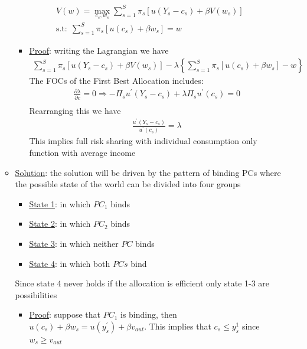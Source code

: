 \documentclass{article}
\begin{document}
\begin{itemize}
\begin{itemize}
        \begin{gather*}
            V(w) = \max_{c_{s}, w_{s}} \sum_{s=1}^{S} \pi_{s} [u(Y_{s} - c_{s}) + \beta V(w_{s})] \\
            \text{s.t:} \ \ \sum_{s=1}^{S} \pi_{s} [u(c_{s}) + \beta w_{s}] = w
        \end{gather*}
        \begin{itemize}
            \item  \underline{Proof}: writing the Lagrangian we have
            \begin{gather*}
                \sum_{s=1}^{S} \pi_{s} [u(Y_{s} - c_{s}) + \beta V(w_{s})] - \lambda \left\{\sum_{s=1}^{S} \pi_{s} [u(c_{s}) + \beta w_{s}] - w \right\}
            \end{gather*}
            The FOCs of the First Best Allocation includes:
            \begin{gather*}
                \frac{\partial \lambda}{\partial c} = 0 \Rightarrow -\Pi_{s}u^{'}(Y_{s} - c_{s}) + \lambda \Pi_{s} u^{'}(c_{s}) = 0 \\
            \end{gather*}
            Rearranging this we have
            \begin{gather*}
                \frac{u^{'}(Y_{s} - c_{s})}{u^{'}(c_{s})} = \lambda
            \end{gather*}
            This implies full risk sharing with individual consumption only function with average income
        \end{itemize}
        \item \underline{Solution}: the solution will be driven by the pattern of binding PCs where the possible state of the world can be divided into four groups
        \begin{itemize}
            \item  \underline{State 1}: in which $PC_{1}$ binds
            \item  \underline{State 2}: in which $PC_{2}$ binds
            \item  \underline{State 3}: in which neither $PC$ binds
            \item  \underline{State 4}: in which both $PCs$ bind
        \end{itemize}
        Since state 4 never holds if the allocation is efficient only state 1-3 are possibilities
        \begin{itemize}
            \item  \underline{Proof}: suppose that $PC_{1}$ is binding, then $u(c_{s}) + \beta w_{s} = u(y_{s}^{'}) + \beta v_{aut}$. This implies that $c_{s} \leq y_{s}^{1}$ since $w_{s} \geq v_{aut}$

\end{itemize}
\end{itemize}
\end{itemize}
\end{document}
